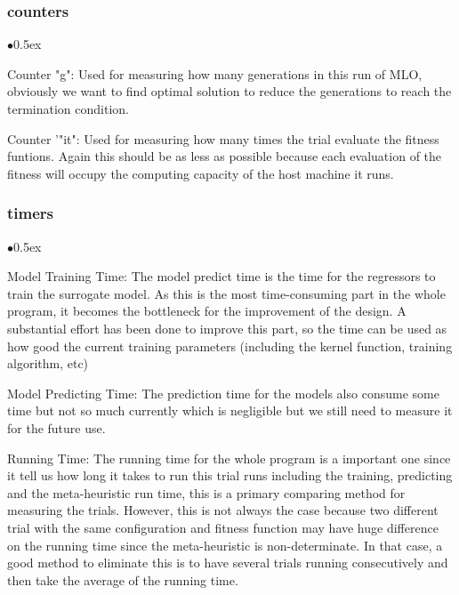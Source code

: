 \documentclass[12pt, runningheads,a4paper]{llncs}
\begin{document}
\subsubsection{counters}
\begin{list}{$\bullet$}{\itemsep 0.5ex}
\item Counter "g": Used for measuring how many generations in this run of MLO, obviously we want to find optimal solution to reduce the generations to reach the termination condition.
\item Counter '"it": Used for measuring how many times the trial evaluate the fitness funtions. Again this should be as less as possible because each evaluation of the fitness will occupy the computing capacity of the host machine it runs. 

\end{list}

\subsubsection{timers}
\begin{list}{$\bullet$}{\itemsep 0.5ex}
\item Model Training Time: The model predict time is the time for the regressors to train the surrogate model. As this is the most time-consuming part in the whole program, it becomes the bottleneck for the improvement of the design. A substantial effort has been done to improve this part, so the time can be used as how good the current training parameters (including the kernel function, training algorithm, etc)
\item Model Predicting Time: The prediction time for the models also consume some time but not so much currently which is negligible but we still need to measure it for the future use.
\item Running Time: The running time for the whole program is a important one since it tell us how long it takes to run this trial runs including the training, predicting and the meta-heuristic run time, this is a primary comparing method for measuring the trials. However, this is not always the case because two different trial with the same configuration and fitness function may have huge difference on the running time since the meta-heuristic is non-determinate. In that case, a good method to eliminate this is to have several trials running consecutively and then take the average of the running time.
\end{list}
\end{document}
